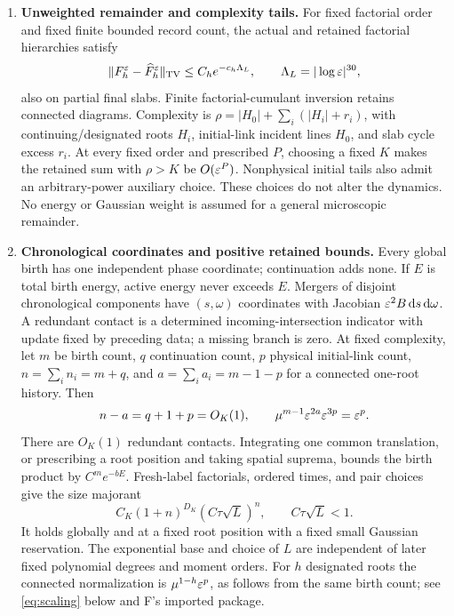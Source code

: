 \begin{enumerate}[label=H\arabic*.,ref=H\arabic*,leftmargin=2.8em]
\item\label{H:remainder}\textbf{Unweighted remainder and complexity tails.}
For fixed factorial order and fixed finite bounded record count, the actual
and retained factorial hierarchies satisfy
\begin{equation}\label{eq:unweighted}
 \|F_h^\varepsilon-\widehat F_h^\varepsilon\|_{\mathrm{TV}}
       \le C_h e^{-c_h\Lambda_L},\qquad\Lambda_L=|\log\varepsilon|^{30},
\end{equation}
also on partial final slabs. Finite factorial-cumulant inversion retains
connected diagrams. Complexity is
$\rho=|H_0|+\sum_i(|H_i|+r_i)$, with continuing/designated roots $H_i$,
initial-link incident lines $H_0$, and slab cycle excess $r_i$.
At every fixed order and prescribed $P$, choosing a fixed $K$ makes the
retained sum with $\rho>K$ be $O(\varepsilon^P)$.
Nonphysical initial tails also admit an arbitrary-power auxiliary choice.
These choices do not alter the dynamics. No energy or Gaussian weight is
assumed for a general microscopic remainder.

\item\label{H:majorant}\textbf{Chronological coordinates and positive retained bounds.}
Every global birth has one independent phase coordinate; continuation adds
none. If $E$ is total birth energy, active energy never exceeds $E$.
Mergers of disjoint chronological components have $(s,\omega)$ coordinates
with Jacobian $\varepsilon^2B\,\mathrm d s\,\mathrm d\omega$. A redundant contact is a determined
incoming-intersection indicator with update fixed by preceding data; a missing
branch is zero. At fixed complexity, let $m$ be birth count, $q$ continuation
count, $p$ physical initial-link count, $n=\sum_i n_i=m+q$, and
$a=\sum_i a_i=m-1-p$ for a connected one-root history. Then
\[
 n-a=q+1+p=O_K(1),\qquad
 \mu^{m-1}\varepsilon^{2a}\varepsilon^{3p}=\varepsilon^p.
\]
There are $O_K(1)$ redundant contacts. Integrating one common translation,
or prescribing a root position and taking spatial suprema, bounds the birth
product by $C^m e^{-bE}$. Fresh-label factorials, ordered times, and pair
choices give the size majorant
\begin{equation}\label{eq:majorant}
 C_K(1+n)^{D_K}(C\tau\sqrt L)^n,
                       \qquad C\tau\sqrt L<1.
\end{equation}
It holds globally and at a fixed root position with a fixed small Gaussian
reservation. The exponential base and choice of $L$ are independent of later
fixed polynomial degrees and moment orders. For $h$ designated roots the
connected normalization is $\mu^{1-h}\varepsilon^p$, as follows from the same
birth count; see \eqref{eq:scaling} below and F's imported package.


\end{enumerate}
